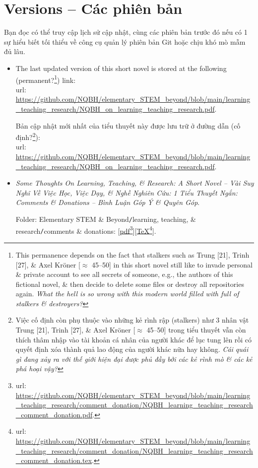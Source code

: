 \documentclass[12pt,oneside]{book}
\begin{document}
\section{Versions -- Các phiên bản}
Bạn đọc có thể truy cập lịch sử cập nhật, cùng các phiên bản trước đó nếu có 1 sự hiểu biết tối thiểu về công cụ quản lý phiên bản Git hoặc chịu khó mò mẫm đủ lâu.
\begin{itemize}
	\item The last updated version of this short novel is stored at the following (permanent?\footnote{This permanence depends on the fact that stalkers such as {\sf Trung [21], Trinh [27]}, \& {\sf Axel Kr\"oner [$\approx$ 45--50]} in this short novel still like to invade personal \& private account to see all secrets of someone, e.g., the authors of this fictional novel, \& then decide to delete some files or destroy all repositories again. {\it What the hell is so wrong with this modern world filled with full of stalkers \& destroyers?}}) link:\\{\sc url}: {\sf\small\url{https://github.com/NQBH/elementary_STEM_beyond/blob/main/learning_teaching_research/NQBH_on_learning_teaching_research.pdf}}.
	
	Bản cập nhật mới nhất của tiểu thuyết này được lưu trữ ở đường dẫn (cố định?\footnote{Việc cố định còn phụ thuộc vào những kẻ rình rập (stalkers) như 3 nhân vật {\sf Trung [21], Trinh [27]}, \& {\sf Axel Kr\"oner [$\approx$ 45--50]} trong tiểu thuyết vẫn còn thích thâm nhập vào tài khoản cá nhân của người khác để lục tung lên rồi có quyết định xóa thành quả lao động của người khác nữa hay không. {\it Cái quái gì đang xảy ra với thế giới hiện đại được phủ đầy bởi các kẻ rình mò \& các kẻ phá hoại vậy?}}):\\{\sc url}: {\sf\small\url{https://github.com/NQBH/elementary_STEM_beyond/blob/main/learning_teaching_research/NQBH_on_learning_teaching_research.pdf}}.
	\item {\it Some Thoughts On Learning, Teaching, \& Research: A Short Novel -- Vài Suy Nghĩ Về Việc Học, Việc Dạy, \& Nghề Nghiên Cứu: 1 Tiểu Thuyết Ngắn: Comments \& Donations -- Bình Luận Góp Ý \& Quyên Góp}.
	
	Folder: {\sf Elementary STEM \& Beyond{\tt/}learning, teaching, \& research{\tt/}comments \& donations}: [\href{https://github.com/NQBH/elementary_STEM_beyond/blob/main/learning_teaching_research/comment_donation/NQBH_learning_teaching_research_comment_donation.pdf}{pdf}\footnote{{\sc url}: \url{https://github.com/NQBH/elementary_STEM_beyond/blob/main/learning_teaching_research/comment_donation/NQBH_learning_teaching_research_comment_donation.pdf}.}][\href{https://github.com/NQBH/elementary_STEM_beyond/blob/main/learning_teaching_research/comment_donation/NQBH_learning_teaching_research_comment_donation.tex}{\TeX}\footnote{{\sc url}: \url{https://github.com/NQBH/elementary_STEM_beyond/blob/main/learning_teaching_research/comment_donation/NQBH_learning_teaching_research_comment_donation.tex}.}].
\end{itemize}
\end{document}
